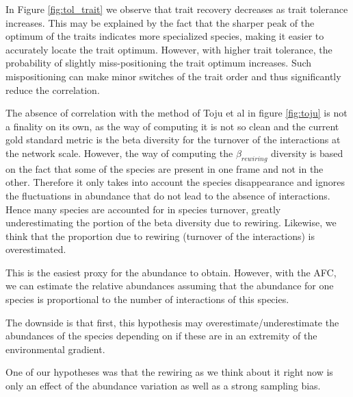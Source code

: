 In Figure \ref{fig:tol_trait} we observe that trait recovery decreases as trait tolerance increases.
This may be explained by the fact that the sharper peak of the optimum of the traits indicates more specialized species, making it easier to accurately locate the trait optimum. However, with higher trait tolerance, the probability of slightly miss-positioning the trait optimum increases. Such mispositioning can make minor switches of the trait order and thus significantly reduce the correlation.



The absence of correlation with the method of Toju et al in figure \ref{fig:toju} is not a finality on its own, as the way of computing it is not so clean and the current gold standard metric is the beta diversity for the turnover of the interactions at the network scale. However, the way of computing the $\beta_{rewiring}$ diversity is based on the fact that some of the species are present in one frame and not in the other. Therefore it only takes into account the species disappearance and ignores the fluctuations in abundance that do not lead to the absence of interactions. Hence many species are accounted for in species turnover, greatly underestimating the portion of the beta diversity due to rewiring. Likewise, we think that the proportion due to rewiring (turnover of the interactions) is overestimated.

This is the easiest proxy for the abundance to obtain. However, with the AFC, we can estimate the relative abundances assuming that the abundance for one species is proportional to the number of interactions of this species.

The downside is that first, this hypothesis may overestimate/underestimate the abundances of the species depending on if these are in an extremity of the environmental gradient.


One of our hypotheses was that the rewiring as we think about it right now is only an effect of the abundance variation as well as a strong sampling bias.










